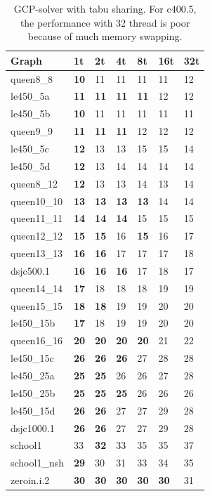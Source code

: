 \documentclass[12pt,a4paper,twoside]{scrartcl}
\numberwithin{equation}{section}
\begin{document}
\begin{table}[h!]
\caption{GCP-solver with tabu sharing. For c400.5, the performance with 32 thread is poor because of much memory swapping.}
\label{tab:tabu sharing}
\footnotesize
\begin{tabular}{|p{3cm} |p{1cm} p{1cm} p{1cm} p{1cm} p{1cm} p{1cm}|}
\hline
Graph&1t&2t&4t&8t&16t&32t\\ \hline
queen8\_8&\textbf{10}&11&11&11&11&12\\
le450\_5a&\textbf{11}&\textbf{11}&\textbf{11}&\textbf{11}&12&12\\
le450\_5b&\textbf{10}&11&11&11&11&11\\
queen9\_9&\textbf{11}&\textbf{11}&\textbf{11}&12&12&12\\ 
le450\_5c&\textbf{12}&13&13&15&15&14\\ \hline
le450\_5d&\textbf{12}&13&14&14&14&14\\ 
queen8\_12&\textbf{12}&13&13&14&13&14\\
queen10\_10&\textbf{13}&\textbf{13}&\textbf{13}&\textbf{13}&14&14\\ 
queen11\_11&\textbf{14}&\textbf{14}&\textbf{14}&15&15&15\\ 
queen12\_12&\textbf{15}&\textbf{15}&16&\textbf{15}&16&17\\ \hline
queen13\_13&\textbf{16}&\textbf{16}&17&17&17&18\\ 
dsjc500.1&\textbf{16}&\textbf{16}&\textbf{16}&17&18&17\\ 
queen14\_14&\textbf{17}&18&18&18&19&19\\ 
queen15\_15&\textbf{18}&\textbf{18}&19&19&20&20\\ 
le450\_15b&\textbf{17}&18&19&19&20&20\\ \hline
queen16\_16&\textbf{20}&\textbf{20}&\textbf{20}&\textbf{20}&21&22\\ 
le450\_15c&\textbf{26}&\textbf{26}&\textbf{26}&27&28&28\\ 
le450\_25a&\textbf{25}&\textbf{25}&26&26&27&28\\
le450\_25b&\textbf{25}&\textbf{25}&\textbf{25}&26&26&26\\ 
le450\_15d&\textbf{26}&\textbf{26}&27&27&29&28\\ \hline
dsjc1000.1&\textbf{26}&\textbf{26}&27&27&29&28\\
school1&33&\textbf{32}&33&35&35&37\\ 
school1\_nsh&\textbf{29}&30&31&33&34&35\\ 
zeroin.i.2&\textbf{30}&\textbf{30}&\textbf{30}&\textbf{30}&\textbf{30}&31\\

\end{tabular}
\end{table}
\end{document}
